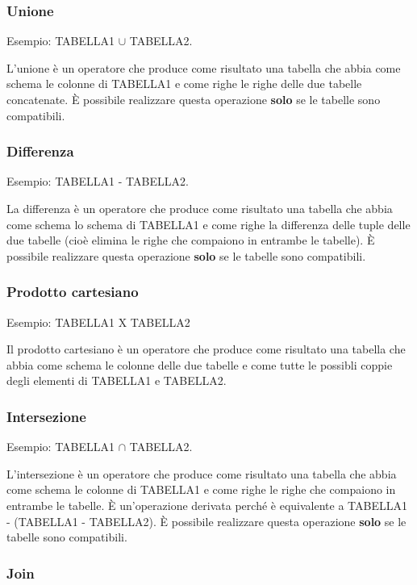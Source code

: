 \documentclass[\main/main.tex]{subfiles}
\begin{document}
\subsubsection{Unione}

Esempio: TABELLA1 $\cup$ TABELLA2.

L'unione è un operatore che produce come risultato una tabella che abbia come schema le colonne di TABELLA1 e come righe le righe delle due tabelle concatenate.
È possibile realizzare questa operazione \textbf{solo} se le tabelle sono compatibili.

\subsubsection{Differenza}

Esempio: TABELLA1 - TABELLA2.

La differenza è un operatore che produce come risultato una tabella che abbia come schema lo schema di TABELLA1 e come righe la differenza delle tuple delle due tabelle (cioè elimina le righe che compaiono in entrambe le tabelle).
È possibile realizzare questa operazione \textbf{solo} se le tabelle sono compatibili.


\subsubsection{Prodotto cartesiano}

Esempio: TABELLA1 X TABELLA2

Il prodotto cartesiano è un operatore che produce come risultato una tabella che abbia come schema le colonne delle due tabelle e come tutte le possibli coppie degli elementi di TABELLA1 e TABELLA2.

\subsubsection{Intersezione}

Esempio: TABELLA1 $\cap$ TABELLA2.

L'intersezione è un operatore che produce come risultato una tabella che abbia come schema le colonne di TABELLA1 e come righe le righe che compaiono in entrambe le tabelle.
È un'operazione derivata perché è equivalente a TABELLA1 - (TABELLA1 - TABELLA2).
È possibile realizzare questa operazione \textbf{solo} se le tabelle sono compatibili.


\subsubsection{Join}
\end{document}
